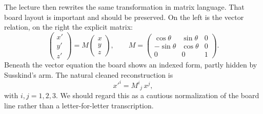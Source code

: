The lecture then rewrites the same transformation in matrix language. That board layout is important and should be preserved. On the left is the vector relation, on the right the explicit matrix:
\begin{equation}
\begin{pmatrix}
x'\\
y'\\
z'
\end{pmatrix}
=
M
\begin{pmatrix}
x\\
y\\
z
\end{pmatrix},
\qquad
M=
\begin{pmatrix}
\cos\theta & \sin\theta & 0 \\
-\sin\theta & \cos\theta & 0 \\
0 & 0 & 1
\end{pmatrix}.
\end{equation}
Beneath the vector equation the board shows an indexed form, partly hidden by Susskind's arm. The natural cleaned reconstruction is
\begin{equation}
x'^i = M^i{}_{j}\,x^j,
\end{equation}
with \(i,j=1,2,3\). We should regard this as a cautious normalization of the board line rather than a letter-for-letter transcription.

